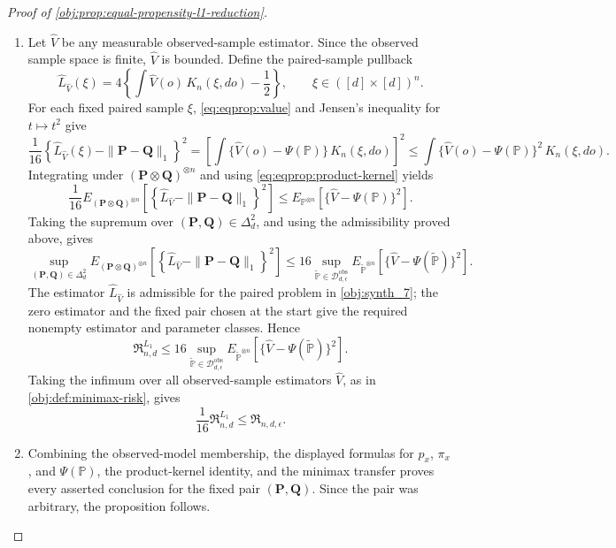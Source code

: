 \begin{proof}[Proof of \cref{obj:prop:equal-propensity-l1-reduction}]
\begin{enumerate}
\item Let \(\widehat V\) be any measurable observed-sample estimator. Since the observed sample
space is finite, \(\widehat V\) is bounded. Define the paired-sample pullback
\[
\widehat L_{\widehat V}(\xi)
=
4\left\{\int \widehat V(o)\,K_n(\xi,do)-\frac12\right\},
\qquad
\xi\in([d]\times[d])^n .
\]
For each fixed paired sample \(\xi\), \cref{eq:eqprop:value} and Jensen's inequality for
\(t\mapsto t^2\) give
\[
\frac1{16}
\left\{
\widehat L_{\widehat V}(\xi)-\|\mathbf P-\mathbf Q\|_1
\right\}^2
=
\left[
\int\{\widehat V(o)-\Psi(\mathbb P)\}\,K_n(\xi,do)
\right]^2
\le
\int\{\widehat V(o)-\Psi(\mathbb P)\}^2\,K_n(\xi,do).
\]
Integrating under \((\mathbf P\otimes\mathbf Q)^{\otimes n}\) and using
\cref{eq:eqprop:product-kernel} yields
\[
\frac1{16}
E_{(\mathbf P\otimes\mathbf Q)^{\otimes n}}
\left[
\left\{
\widehat L_{\widehat V}-\|\mathbf P-\mathbf Q\|_1
\right\}^2
\right]
\le
E_{\mathbb P^{\otimes n}}
\left[
\{\widehat V-\Psi(\mathbb P)\}^2
\right].
\]
Taking the supremum over \((\mathbf P,\mathbf Q)\in\Delta_d^2\), and using the admissibility
proved above, gives
\[
\sup_{(\mathbf P,\mathbf Q)\in\Delta_d^2}
E_{(\mathbf P\otimes\mathbf Q)^{\otimes n}}
\left[
\left\{
\widehat L_{\widehat V}-\|\mathbf P-\mathbf Q\|_1
\right\}^2
\right]
\le
16
\sup_{\widetilde{\mathbb P}\in\mathcal D_{d,\epsilon}^{\mathrm{obs}}}
E_{\widetilde{\mathbb P}^{\otimes n}}
\left[
\{\widehat V-\Psi(\widetilde{\mathbb P})\}^2
\right].
\]
The estimator \(\widehat L_{\widehat V}\) is admissible for the paired problem in
\cref{obj:synth_7}; the zero estimator and the fixed pair chosen at the start give the required
nonempty estimator and parameter classes. Hence
\[
\mathfrak R^{L_1}_{n,d}
\le
16
\sup_{\widetilde{\mathbb P}\in\mathcal D_{d,\epsilon}^{\mathrm{obs}}}
E_{\widetilde{\mathbb P}^{\otimes n}}
\left[
\{\widehat V-\Psi(\widetilde{\mathbb P})\}^2
\right].
\]
Taking the infimum over all observed-sample estimators \(\widehat V\), as in
\cref{obj:def:minimax-risk}, gives
\[
\frac1{16}\mathfrak R^{L_1}_{n,d}
\le
\mathfrak R_{n,d,\epsilon}.
\] %

\item Combining the observed-model membership, the displayed formulas for \(p_x\), \(\pi_x\), and
\(\Psi(\mathbb P)\), the product-kernel identity, and the minimax transfer proves every asserted
conclusion for the fixed pair \((\mathbf P,\mathbf Q)\). Since the pair was arbitrary, the proposition
follows. %
\end{enumerate}
\end{proof}

